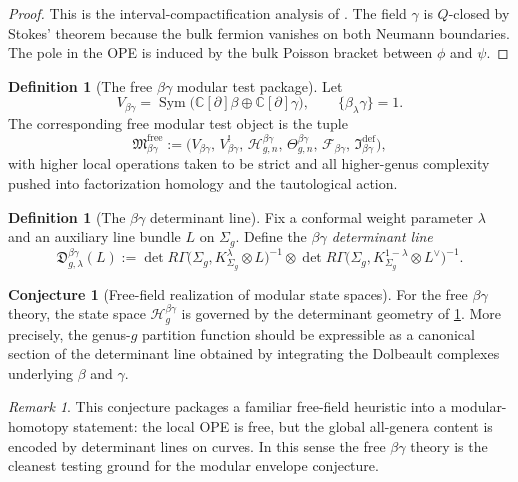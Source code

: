 \documentclass[11pt]{article}
\theoremstyle{definition}
\newtheorem{definition}[theorem]{Definition}
\newtheorem{conjecture}[theorem]{Conjecture}
\theoremstyle{remark}
\newtheorem{remark}[theorem]{Remark}
\newcommand{\F}{\mathcal F}
\newcommand{\Hh}{\mathcal H}
\newcommand{\ModEnv}{\mathfrak M}
\newcommand{\Sym}{\operatorname{Sym}}
\newcommand{\defect}{\mathrm{def}}
\newcommand{\bbeta}{\beta}
\newcommand{\bgamma}{\gamma}
\begin{document}
\begin{proof}
This is the interval-compactification analysis of \cite[\S4.2]{CDG2023}. The field $\bgamma$ is $Q$-closed by Stokes' theorem because the bulk fermion vanishes on both Neumann boundaries. The pole in the OPE is induced by the bulk Poisson bracket between $\phi$ and $\psi$.
\end{proof}

\begin{definition}[The free $\bbeta\bgamma$ modular test package]\label{def:beta-gamma-modular-package}
Let
\[
V_{\bbeta\bgamma}
=
\Sym\bigl(\mathbb C[\partial]\bbeta\oplus \mathbb C[\partial]\bgamma\bigr),
\qquad
\{\bbeta_\lambda \bgamma\}=1.
\]
The corresponding free modular test object is the tuple
\[
\ModEnv_{\bbeta\bgamma}^{\mathrm{free}}
:=
\bigl(V_{\bbeta\bgamma},\,V_{\bbeta\bgamma}^!,\,\Hh_{g,n}^{\bbeta\bgamma},\,\Theta^{\bbeta\bgamma}_{g,n},\,\F_{\bbeta\bgamma},\,\mathfrak I_{\bbeta\bgamma}^{\defect}\bigr),
\]
with higher local operations taken to be strict and all higher-genus complexity pushed into factorization homology and the tautological action.
\end{definition}

\begin{definition}[The $\bbeta\bgamma$ determinant line]\label{def:beta-gamma-det-line}
Fix a conformal weight parameter $\lambda$ and an auxiliary line bundle $L$ on $\Sigma_g$. Define the \emph{$\bbeta\bgamma$ determinant line}
\[
\mathfrak D^{\bbeta\bgamma}_{g,\lambda}(L)
:=
\det R\Gamma\bigl(\Sigma_g,K_{\Sigma_g}^{\lambda}\otimes L\bigr)^{-1}
\otimes
\det R\Gamma\bigl(\Sigma_g,K_{\Sigma_g}^{1-\lambda}\otimes L^{\vee}\bigr)^{-1}.
\]
\end{definition}

\begin{conjecture}[Free-field realization of modular state spaces]\label{conj:beta-gamma-det-line}
For the free $\bbeta\bgamma$ theory, the state space $\Hh_g^{\bbeta\bgamma}$ is governed by the determinant geometry of \cref{def:beta-gamma-det-line}. More precisely, the genus-$g$ partition function should be expressible as a canonical section of the determinant line obtained by integrating the Dolbeault complexes underlying $\bbeta$ and $\bgamma$.
\end{conjecture}

\begin{remark}
This conjecture packages a familiar free-field heuristic into a modular-homotopy statement: the local OPE is free, but the global all-genera content is encoded by determinant lines on curves. In this sense the free $\bbeta\bgamma$ theory is the cleanest testing ground for the modular envelope conjecture.
\end{remark}
\end{document}
